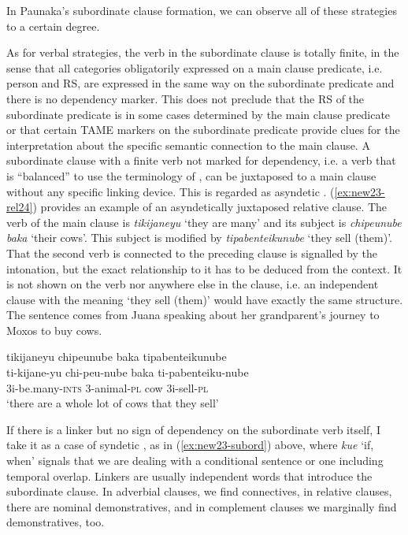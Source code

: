 In Paunaka’s subordinate clause formation, we can observe all of these strategies to a certain degree.  

As for verbal strategies, the verb in the subordinate clause is totally finite, in the sense that all categories obligatorily expressed on a main clause predicate, i.e. person and RS, are expressed in the same way on the subordinate predicate and there is no dependency marker. This does not preclude that the RS of the subordinate predicate is in some cases determined by the main clause predicate or that certain TAME markers on the subordinate predicate provide clues for the interpretation about the specific semantic connection to the main clause. A subordinate clause with a finite verb not marked for dependency, i.e. a verb that is “balanced” to use the terminology of \citet[]{Cristofaro2003}, can be juxtaposed to a main clause without any specific linking device. This is regarded as asyndetic . (\ref{ex:new23-rel24}) provides an example of an asyndetically juxtaposed relative clause. The verb of the main clause is \textit{tikijaneyu} ‘they are many’ and its subject is \textit{chipeunube baka} ‘their cows’. This subject is modified by \textit{tipabenteikunube} ‘they sell (them)’. That the second verb is connected to the preceding clause is signalled by the intonation, but the exact relationship to it has to be deduced from the context. It is not shown on the verb nor anywhere else in the clause, i.e. an independent clause with the meaning ‘they sell (them)’ would have exactly the same structure. The sentence comes from Juana speaking about her grandparent’s journey to Moxos to buy cows.

\ea\label{ex:new23-rel24}
\begingl
\glpreamble tikijaneyu chipeunube baka tipabenteikunube\\
\gla ti-kijane-yu chi-peu-nube baka ti-pabenteiku-nube\\
\glb 3i-be.many-\textsc{ints} 3-animal-\textsc{pl} cow 3i-sell-\textsc{pl}\\
\glft ‘there are a whole lot of cows that they sell’
\endgl
\trailingcitation{[jxx-e150925l-1.211]}
\xe


If there is a linker but no sign of dependency on the subordinate verb itself, I take it as a case of syndetic , as in (\ref{ex:new23-subord}) above, where \textit{kue} ‘if, when’ signals that we are dealing with a conditional sentence or one including temporal overlap. Linkers are usually independent words that introduce the subordinate clause. In adverbial clauses, we find connectives, in relative clauses, there are nominal demonstratives, and in complement clauses we marginally find demonstratives, too. 

